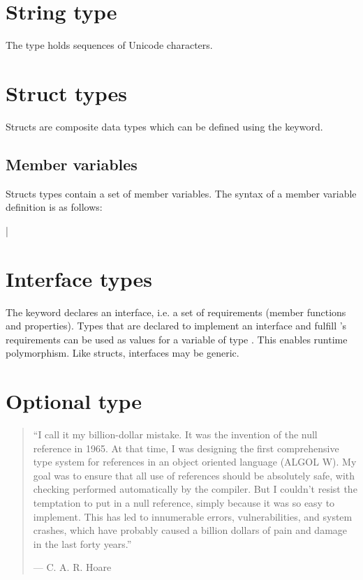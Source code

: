 \section{String type}

The type  holds sequences of Unicode characters.

\section{Struct types}

Structs are composite data types which can be defined using the 
keyword.

\subsection{Member variables}

Structs types contain a set of member variables. The syntax of a member variable
definition is as follows:

\begin{grammar}
 \textrightarrow{}  | \\
 \textrightarrow{}   \code{:}  \code{;}
\end{grammar}

\section{Interface types}

The  keyword declares an interface, i.e. a set of requirements
(member functions and properties). Types that are declared to implement an
interface  and fulfill 's requirements can be used as values for
a variable of type . This enables runtime polymorphism. Like structs,
interfaces may be generic.

\section{Optional type}

\begin{quote}
``I call it my billion-dollar mistake. It was the invention of the null
reference in 1965. At that time, I was designing the first comprehensive type
system for references in an object oriented language (ALGOL W). My goal was to
ensure that all use of references should be absolutely safe, with checking
performed automatically by the compiler. But I couldn't resist the temptation to
put in a null reference, simply because it was so easy to implement. This has
led to innumerable errors, vulnerabilities, and system crashes, which have
probably caused a billion dollars of pain and damage in the last forty years.''

--- C. A. R. Hoare
\end{quote}

